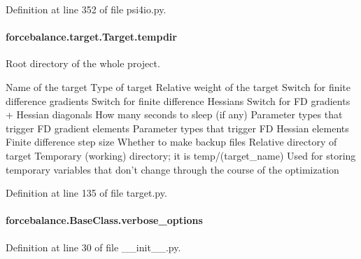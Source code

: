 Definition at line 352 of file psi4io.\-py.

\hypertarget{classforcebalance_1_1target_1_1Target_aa1f01b5b78db253b5b66384ed11ed193}{
\paragraph[{tempdir}]{\setlength{\rightskip}{0pt plus 5cm}forcebalance.\-target.\-Target.\-tempdir\hspace{0.3cm}{\ttfamily [inherited]}}}\label{classforcebalance_1_1target_1_1Target_aa1f01b5b78db253b5b66384ed11ed193}


Root directory of the whole project. 

Name of the target Type of target Relative weight of the target Switch for finite difference gradients Switch for finite difference Hessians Switch for F\-D gradients + Hessian diagonals How many seconds to sleep (if any) Parameter types that trigger F\-D gradient elements Parameter types that trigger F\-D Hessian elements Finite difference step size Whether to make backup files Relative directory of target Temporary (working) directory; it is temp/(target\-\_\-name) Used for storing temporary variables that don't change through the course of the optimization 

Definition at line 135 of file target.\-py.

\hypertarget{classforcebalance_1_1BaseClass_afd68efa29ccd2f320f4cf82198214aac}{
\paragraph[{verbose\-\_\-options}]{\setlength{\rightskip}{0pt plus 5cm}forcebalance.\-Base\-Class.\-verbose\-\_\-options\hspace{0.3cm}{\ttfamily [inherited]}}}\label{classforcebalance_1_1BaseClass_afd68efa29ccd2f320f4cf82198214aac}


Definition at line 30 of file \-\_\-\-\_\-init\-\_\-\-\_\-.\-py.

